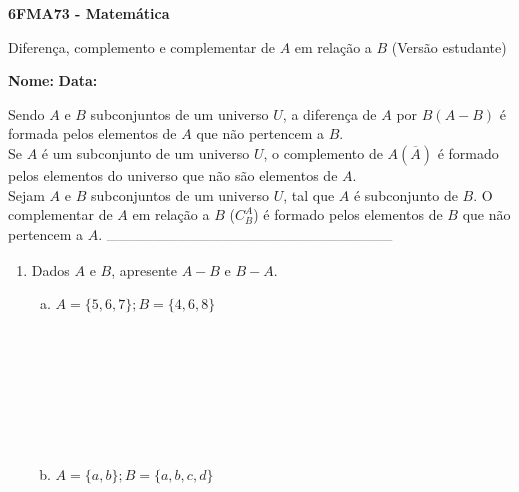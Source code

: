 \documentclass[a4paper,14pt]{article}
\begin{document}
	
	\noindent\textbf{6FMA73 - Matemática} 
	
	\begin{center}Diferença, complemento e complementar de $A$ em relação a $B$ (Versão estudante)
	\end{center}
	
	\noindent\textbf{Nome:} \underline{\hspace{10cm}}
	\noindent\textbf{Data:} \underline{\hspace{4cm}}
	
	
	\begin{multicols}{2}
		\noindent Sendo $A$ e $B$ subconjuntos de um universo $U$, a diferença de $A$ por $B (A - B)$ é formada pelos elementos de $A$ que não pertencem a $B$. \\
		Se $A$ é um subconjunto de um universo $U$, o complemento de $A(\overline{A})$ é formado pelos elementos do universo que não são elementos de $A$. \\
		Sejam $A$ e $B$ subconjuntos de um universo $U$, tal que $A$ é subconjunto de $B$. O complementar de $A$ em relação a $B$ ($C_B^{A}$) é formado pelos elementos de $B$ que não pertencem a $A$.
		\noindent\textsubscript{--------------------------------------------------------------------------}
    	\begin{enumerate}
   			\item Dados $A$ e $B$, apresente $A - B$ e $B - A$.
   			\begin{enumerate}[a)]
   				\item $A = \{5, 6, 7\}; B = \{4, 6, 8\}$ \\\\\\\\\\\\\\\\
   				\item $A = \{a, b\}; B = \{a, b, c, d\}$ \\\\\\\\\\\\\\\\

\end{enumerate}
\end{enumerate}
\end{multicols}
\end{document}
